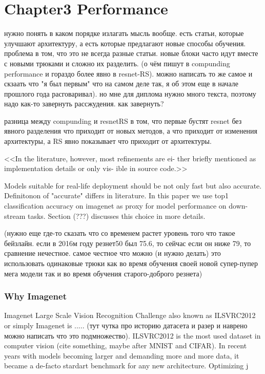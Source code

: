 
\chapter{Chapter3 Performance}

нужно понять в каком порядке излагать мысль вообще. есть статьи, которые улучшают архитектуру, а есть которые предлагают новые способы обучения. проблема в том, что это не всегда разные статьи. новые блоки часто идут вместе с новыми трюками и сложно их разделить. (о чём пишут в compunding performance и гораздо более явно в resnet-RS). можно написать то же самое и скзаать что "я был первым" что на самом деле так, я об этом еще в начале прошлого года расговаривал). но мне для диплома нужно много текста, поэтому надо как-то завернуть рассжудения. как завернуть? 

разница между compunding и resnetRS в том, что первые бустят resnet без явного разделения что приходит от новых методов, а что приходит от изменения архитектуры, а RS явно показывает что приходит от архитектуры. 

<<In the literature, however, most refinements are ei- ther briefly mentioned as implementation details or only vis- ible in source code.>>

Models suitable for real-life deployment should be not only fast but also accurate. Definitonon of "accurate" differs in literature. In this paper we use top1 classification accuracy on imagenet as proxy for model performance on down-stream tasks. Section (???) discusses this choice in more details.



(нужно еще где-то сказать что со временем растет уровень того что такое бейзлайн. если в 2016м году резнет50 был 75.6, то сейчас если он ниже 79, то сравнение нечестное. самое честное что можно (и нужно делать) это использовать одинаковые трюки как во время обучения своей новой супер-пупер мега модели так и во время обучения старого-доброго резнета)

\subsection{Why Imagenet}

Imagenet Large Scale Vision Recognition Challenge also known as ILSVRC2012 or simply Imagenet is ..... (тут чутка про историю датасета и разер и наврено можно написать что это подмножество). ILSVRC2012 is the most used dataset in computer vision (cite something, maybe after MNIST and CIFAR). In recent years with models becoming larger and demanding more and more data, it became a de-facto stardart benchmark for any new architecture. Optimizing j

